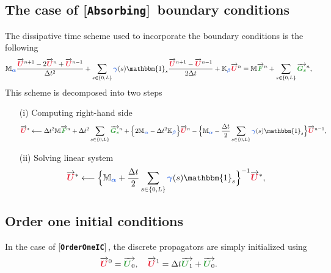 \documentclass[11pt,a4paper]{article}
\newcommand{\unknown}[1]{\bm{{\color{myred}{#1}}}}
\newcommand{\param}[1]{\bm{{\color{myhyperblue}{#1}}}}
\newcommand{\data}[1]{\bm{{\color{mygreen}{#1}}}}
\newcommand{\keyword}[1]{[\texttt{\textbf{#1}}]\!\,}
\begin{document}
\subsection{The case of \keyword{Absorbing} boundary conditions}
The dissipative time scheme used to incorporate the boundary conditions is the following
\begin{equation*}
\mathbb{M}_{\param{\alpha}}\dfrac{\overrightarrow{\unknown{U}}^{n+1} - 2\overrightarrow{\unknown{U}}^{n} + \overrightarrow{\unknown{U}}^{n-1}}{\Delta t^2} + \sum_{s\in\{0, L\}} \param{\gamma}(s)\mathbbm{1}_s \dfrac{\overrightarrow{\unknown{U}}^{n+1} - \overrightarrow{\unknown{U}}^{n-1}}{2\Delta t} + \mathbb{K}_{\param{\beta}} \overrightarrow{\unknown{U}}^{n} = \mathbb{M} \overrightarrow{\data{F}}^n + \sum_{s\in\{0, L\}}  \overrightarrow{\data{G_s}}^n,
\end{equation*}
This scheme is decomposed into two steps
\begin{itemize}
\item[(i)] Computing right-hand side
\begin{equation*}
\overrightarrow{\unknown{U}}^* \longleftarrow \Delta t^2 \mathbb{M} \overrightarrow{\data{F}}^n + \Delta t^2 \sum_{s\in\{0, L\}}  \overrightarrow{\data{G_s}}^n + \Big\{ 2 \mathbb{M}_{\param{\alpha}} - \Delta t^2 \mathbb{K}_{\param{\beta}} \Big\} \overrightarrow{\unknown{U}}^{n} - \Big\{ \mathbb{M}_{\param{\alpha}} - \dfrac{\Delta t}{2} \sum_{s\in\{0, L\}} \param{\gamma}(s)\mathbbm{1}_s\Big\} \overrightarrow{\unknown{U}}^{n-1},
\end{equation*}
\item[(ii)] Solving linear system
\begin{equation*}
\overrightarrow{\unknown{U}}^* \longleftarrow \Big\{\mathbb{M}_{\param{\alpha}} + \dfrac{\Delta t}{2} \sum_{s\in\{0, L\}} \param{\gamma}(s)\mathbbm{1}_s \Big\}^{-1} \overrightarrow{\unknown{U}}^*,
\end{equation*}
\end{itemize}

\subsection{Order one initial conditions}
In the case of \keyword{OrderOneIC}, the discrete propagators are simply initialized using
\begin{equation*}
\overrightarrow{\unknown{U}}^0 = \overrightarrow{\data{U}_0}, \quad \overrightarrow{\unknown{U}}^1 = \Delta t \overrightarrow{\data{U}_1}+ \overrightarrow{\data{U}_0}.
\end{equation*}
\end{document}
